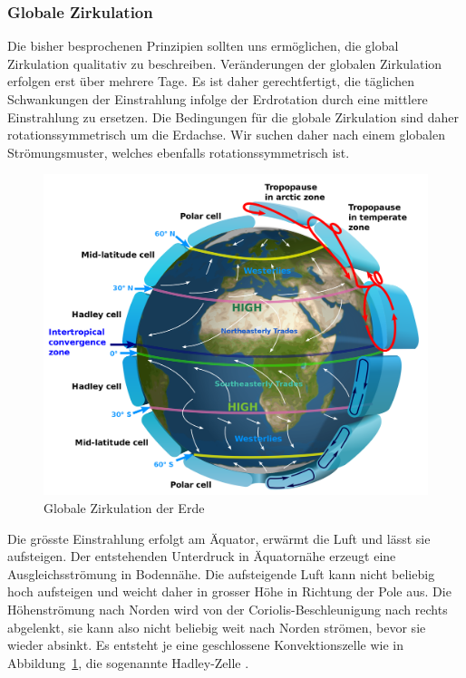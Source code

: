 \subsubsection{Globale Zirkulation}
Die bisher besprochenen Prinzipien sollten uns ermöglichen, die
global Zirkulation qualitativ zu beschreiben.
Veränderungen der globalen Zirkulation erfolgen erst über mehrere Tage.
Es ist daher gerechtfertigt, die täglichen Schwankungen der
Einstrahlung infolge der Erdrotation durch eine mittlere
Einstrahlung zu ersetzen.
Die Bedingungen für die globale Zirkulation sind daher rotationssymmetrisch
um die Erdachse.
Wir suchen daher nach einem globalen Strömungsmuster, welches ebenfalls
rotationssymmetrisch ist.

\begin{figure}
\centering
\includegraphics[width=\hsize]{chapters/1/Earth_Global_Circulation_-_en.png}
\caption{Globale Zirkulation der Erde
\label{skript:globalezirkulation}}
\end{figure}

Die grösste Einstrahlung erfolgt am Äquator, erwärmt die Luft und
lässt sie aufsteigen.
Der entstehenden Unterdruck in Äquatornähe erzeugt eine 
Ausgleichsströmung in Bodennähe.
Die aufsteigende Luft kann nicht beliebig hoch aufsteigen und weicht
daher in grosser Höhe in Richtung der Pole aus.
Die Höhenströmung nach Norden wird von der Coriolis-Beschleunigung nach
rechts abgelenkt, sie kann also nicht beliebig weit nach Norden
strömen, bevor sie wieder absinkt.
Es entsteht je eine geschlossene Konvektionszelle wie in
Abbildung~\ref{skript:globalezirkulation}, die sogenannte
Hadley-Zelle \cite{skript:hadley}.

